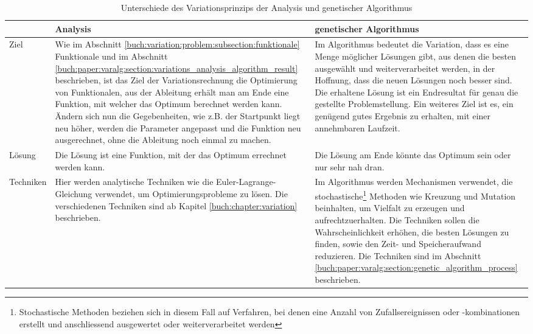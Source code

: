 \begin{xltabular}{\textwidth}{|L|X|X|}
  \caption{Unterschiede des Variationsprinzips der Analysis und genetischer Algorithmus}
  \label{tab:variation_comparison} \\
  \hline
  & Analysis \raisebox{3pt}{\strut}
  & genetischer Algorithmus 
  \raisebox{-2pt}{\strut}
  \\ \hline
  \raisebox{3pt}{\strut}Ziel
  & 
  Wie im Abschnitt \ref{buch:variation:problem:subsection:funktionale} Funktionale und
  im Abschnitt \ref{buch:paper:varalg:section:variations_analysis_algorithm_result}
  beschrieben, ist das Ziel der Variationsrechnung die Optimierung von Funktionalen, aus der
  Ableitung erhält man am Ende eine Funktion, mit welcher das Optimum berechnet werden kann. 
  Ändern sich nun die Gegebenheiten, wie z.B. der Startpunkt liegt neu höher, werden die Parameter 
  angepasst und die Funktion neu ausgerechnet, ohne die Ableitung noch einmal zu machen.
  \raisebox{-2pt}{\strut}
  & 
  Im Algorithmus bedeutet die Variation, dass es eine Menge möglicher Lösungen gibt, 
  aus denen die besten ausgewählt und weiterverarbeitet werden, in der 
  Hoffnung, dass die neuen Lösungen noch besser sind. Die erhaltene Lösung ist ein Endresultat für
  genau die gestellte Problemstellung. Ein weiteres Ziel ist es,
  ein genügend gutes Ergebnis zu erhalten, mit einer annehmbaren Laufzeit.
  \\ \hline
  Lösung\raisebox{3pt}{\strut}
  & 
  Die Lösung ist eine Funktion, mit der das Optimum errechnet werden kann.
  \raisebox{-2pt}{\strut}
  & 
  Die Lösung am Ende könnte das Optimum sein oder nur sehr nah dran.
  \\ \hline
  \raisebox{3pt}{\strut}Techniken  
  & 
  Hier werden analytische Techniken wie die Euler-Lagrange-Gleichung verwendet, 
  um Optimierungsprobleme zu lösen. Die verschiedenen Techniken sind ab Kapitel
  \ref{buch:chapter:variation} beschrieben.
  & Im Algorithmus werden Mechanismen verwendet, die stochastische\footnote{
    Stochastische Methoden beziehen sich in diesem Fall auf Verfahren, bei denen 
    eine Anzahl von Zufallsereignissen oder -kombinationen erstellt und anschliessend 
    ausgewertet oder weiterverarbeitet werden
  }
  Methoden wie Kreuzung und Mutation beinhalten, um Vielfalt zu erzeugen und aufrechtzuerhalten.
  Die Techniken sollen die Wahrscheinlichkeit erhöhen, die besten Lösungen zu finden, 
  sowie den Zeit- und Speicheraufwand reduzieren.
  Die Techniken sind im Abschnitt \ref{buch:paper:varalg:section:genetic_algorithm_process} beschrieben.

\end{xltabular}

